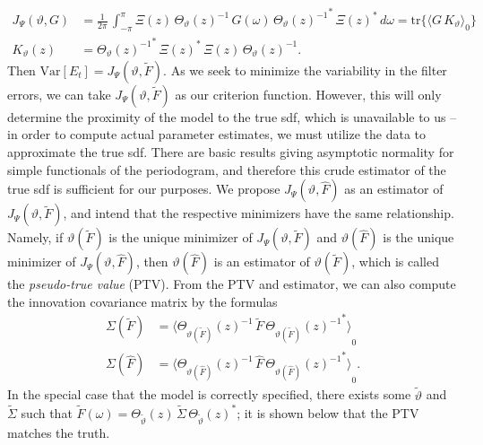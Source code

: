 \documentclass[a4paper]{book}
\begin{document}
\begin{align*}
  J_{\Psi} (\vartheta, G) & 	= \frac{1}{2 \pi} \, \int_{-\pi}^{\pi} \Xi (z) \,
  { \Theta_{\vartheta} (z) }^{-1} \, G(\omega)
  \,  {{ \Theta_{\vartheta} (z) }^{-1} }^* \, { \Xi (z) }^* \, d\omega  = \mbox{tr} \{ 
 { \langle G \, K_{\vartheta} \rangle }_0 \} \\
   K_{\vartheta} (z) & =  {{ \Theta_{\vartheta} (z) }^{-1} }^* \, { \Xi (z) }^* \,  \Xi (z) \, 
 { \Theta_{\vartheta} (z) }^{-1}.
\end{align*}
 Then $\mbox{Var} [ E_t ] = J_{\Psi} (\vartheta, \widetilde{F})$.  As we seek to minimize the variability in the filter errors,
 we can take $J_{\Psi} (\vartheta, \widetilde{F})$ as our criterion function.  However, this will only
 determine the proximity of the model to the true sdf, which is unavailable to us -- in order to compute actual
 parameter estimates, we must utilize the data to approximate the true sdf. 
 There are basic results giving asymptotic normality for simple functionals of the periodogram,
 and therefore this crude  estimator of the true sdf is sufficient for our purposes.  We propose 
$J_{\Psi} (\vartheta, \widehat{F})$ as
 an estimator of $J_{\Psi} (\vartheta, \widetilde{F})$, and intend that the respective minimizers have the same relationship.
 Namely, if $\vartheta (\widetilde{F}) $ is the unique minimizer of 
 $J_{\Psi} (\vartheta, \widetilde{F}) $ and
  $\vartheta (\widehat{F}) $ is the unique minimizer of $J_{\Psi} (\vartheta, \widehat{F}) $, then
 $\vartheta (\widehat{F})$ is an estimator of $\vartheta (\widetilde{F})$, which is called the {\em pseudo-true value} (PTV).
  From the PTV and estimator, we can also compute the innovation covariance matrix by the formulas
\begin{align*}
  \Sigma (\widetilde{F}) & = { \langle { \Theta_{\vartheta (\widetilde{F} ) } (z) }^{-1} \,
   \widetilde{F} \, 
 { { \Theta_{\vartheta(\widetilde{F}) } (z) }^{-1} }^*
	\rangle }_0 \\
    \Sigma (\widehat{F}) & = { \langle { \Theta_{\vartheta (\widehat{F} ) } (z) }^{-1} \, \widehat{F} \, 
{ { \Theta_{\vartheta(\widehat{F}) } (z) }^{-1} }^*
	\rangle }_0.
\end{align*}
 In the special case that the model is correctly specified, there exists some 
$\widetilde{\vartheta}$ and $\widetilde{\Sigma}$ such that
 $\widetilde{F} (\omega) = \Theta_{\widetilde{\vartheta}} (z) \, \widetilde{\Sigma} \, 
{\Theta_{\widetilde{\vartheta}} (z)  }^*$; it is shown below
  that the PTV matches the truth.
 
\end{document}
